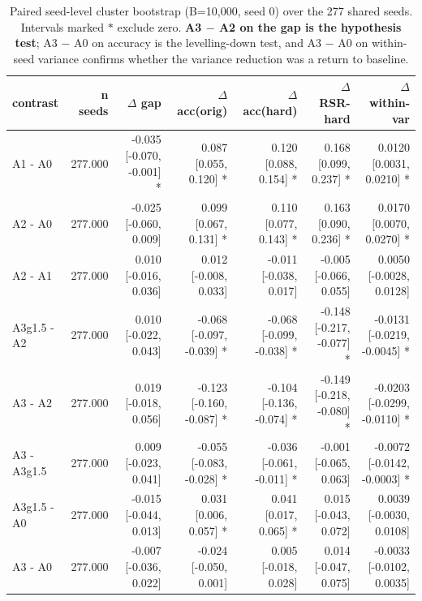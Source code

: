 \begin{table}[t]
\centering
\small
\begin{tabular}{lrrrrrr}
\toprule
contrast & n seeds & $\Delta$ gap & $\Delta$ acc(orig) & $\Delta$ acc(hard) & $\Delta$ RSR-hard & $\Delta$ within-var \\
\midrule
A1 - A0 & 277.000 & -0.035 [-0.070, -0.001] * & 0.087 [0.055, 0.120] * & 0.120 [0.088, 0.154] * & 0.168 [0.099, 0.237] * & 0.0120 [0.0031, 0.0210] * \\
A2 - A0 & 277.000 & -0.025 [-0.060, 0.009] & 0.099 [0.067, 0.131] * & 0.110 [0.077, 0.143] * & 0.163 [0.090, 0.236] * & 0.0170 [0.0070, 0.0270] * \\
A2 - A1 & 277.000 & 0.010 [-0.016, 0.036] & 0.012 [-0.008, 0.033] & -0.011 [-0.038, 0.017] & -0.005 [-0.066, 0.055] & 0.0050 [-0.0028, 0.0128] \\
A3g1.5 - A2 & 277.000 & 0.010 [-0.022, 0.043] & -0.068 [-0.097, -0.039] * & -0.068 [-0.099, -0.038] * & -0.148 [-0.217, -0.077] * & -0.0131 [-0.0219, -0.0045] * \\
A3 - A2 & 277.000 & 0.019 [-0.018, 0.056] & -0.123 [-0.160, -0.087] * & -0.104 [-0.136, -0.074] * & -0.149 [-0.218, -0.080] * & -0.0203 [-0.0299, -0.0110] * \\
A3 - A3g1.5 & 277.000 & 0.009 [-0.023, 0.041] & -0.055 [-0.083, -0.028] * & -0.036 [-0.061, -0.011] * & -0.001 [-0.065, 0.063] & -0.0072 [-0.0142, -0.0003] * \\
A3g1.5 - A0 & 277.000 & -0.015 [-0.044, 0.013] & 0.031 [0.006, 0.057] * & 0.041 [0.017, 0.065] * & 0.015 [-0.043, 0.072] & 0.0039 [-0.0030, 0.0108] \\
A3 - A0 & 277.000 & -0.007 [-0.036, 0.022] & -0.024 [-0.050, 0.001] & 0.005 [-0.018, 0.028] & 0.014 [-0.047, 0.075] & -0.0033 [-0.0102, 0.0035] \\
\bottomrule
\end{tabular}
\caption{Paired seed-level cluster bootstrap (B=10{,}000, seed 0) over the 277 shared seeds. Intervals marked $*$ exclude zero. \textbf{A3 $-$ A2 on the gap is the hypothesis test}; A3 $-$ A0 on accuracy is the levelling-down test, and A3 $-$ A0 on within-seed variance confirms whether the variance reduction was a return to baseline.}
\label{tab:mp_contrasts}
\end{table}